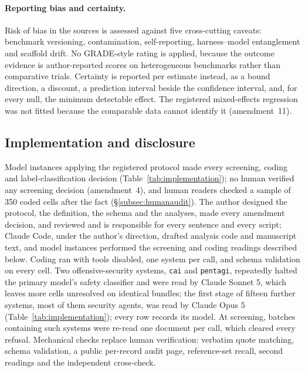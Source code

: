 \paragraph{Reporting bias and certainty.}\label{subsec:reportingbias}
Risk of bias in the sources is assessed against five cross-cutting caveats: benchmark versioning,
contamination, self-reporting, harness--model entanglement and scaffold drift. No GRADE-style rating is
applied, because the outcome evidence is author-reported scores on heterogeneous benchmarks rather than
comparative trials. Certainty is reported per estimate instead, as a bound direction, a discount, a
prediction interval beside the confidence interval, and, for every null, the minimum detectable effect.
The registered mixed-effects regression was not fitted because the comparable data cannot identify it
(amendment~11).

\subsection{Implementation and disclosure}\label{subsec:llmdisclosure}

Model instances applying the registered protocol made every screening, coding and label-classification
decision (Table~\ref{tab:implementation}); no human verified any screening decision (amendment~4), and
human readers checked a sample of 350 coded cells after the fact (\S\ref{subsec:humanaudit}). The author designed the protocol, the definition, the schema and the analyses, made every
amendment decision, and reviewed and is responsible for every sentence and every script; Claude Code,
under the author's direction, drafted analysis code and manuscript text, and model instances performed
the screening and coding readings described below. Coding
ran with tools disabled, one system per call, and schema validation on every cell. Two
offensive-security systems, \texttt{cai} and \texttt{pentagi}, repeatedly halted the primary model's
safety classifier and were read by Claude Sonnet 5, which leaves more cells
unresolved on identical bundles; the first stage of fifteen further systems, most of them security
agents, was read by Claude Opus 5 (Table~\ref{tab:implementation}); every row records its model. At screening, batches containing such
systems were re-read one document per call, which cleared every refusal. Mechanical checks replace human
verification: verbatim quote matching, schema validation, a public per-record audit page, reference-set
recall, second readings and the independent cross-check.

